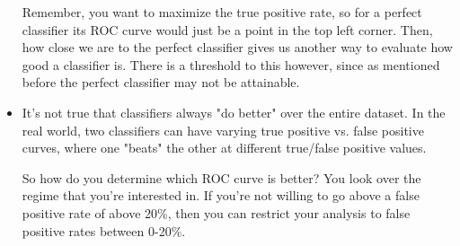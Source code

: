 \begin{itemize}
		Remember, you want to maximize the true positive rate, so for a perfect
		classifier its ROC curve would just be a point in the top left corner. Then,
		how close we are to the perfect classifier gives us another way to evaluate
		how good a classifier is. There is a threshold to this however, since as
		mentioned before the perfect classifier may not be attainable. 
	\item It's not true that classifiers always "do better" over the entire 
		dataset. In the real world, two classifiers can have varying true positive
		vs. false positive curves, where one "beats" the other at different
		true/false positive values. 

		So how do you determine which ROC curve is better? You look over the regime
		that you're interested in. If you're not willing to go above a false positive
		rate of above 20\%, then you can restrict your analysis to false positive
		rates between 0-20\%. 
\end{itemize}

